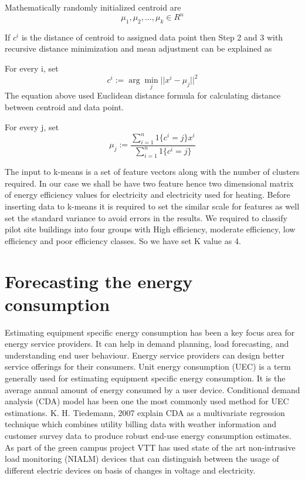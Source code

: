 Mathematically randomly initialized centroid are  
$${\mu_1,\mu_2,\dotsc,\mu_k}  \in R^{n}$$


If \(c^{i}\) is the distance of centroid to assigned data point then Step 2 and 3 with recursive distance minimization and mean adjustment can be explained as 

For every i, set 
\begin{equation}
c^{i} := \arg\min_j || x^{i} - \mu_j||^2
\end{equation} 
The equation above used Euclidean distance formula for calculating distance between centroid and data point. 

For every j, set
\begin{equation}
\mu_{j} := \frac{\sum\limits_{i=1}^n 1\{c^{i} =j\}x^{i}}{\sum\limits_{i=1}^n 1\{c^{i}=j\}}
\end{equation}

The input to k-means is a set of feature vectors along with the number of clusters required. In our case we shall be have two feature hence two dimensional matrix of energy efficiency values for electricity and electricity used for heating. Before inserting data to k-means it is required to set the similar scale for features as well set the standard variance to avoid errors in the results. We required to classify pilot site buildings into four groups with High efficiency, moderate efficiency, low efficiency and poor efficiency classes. So we have set K value as 4.

\section{Forecasting the energy consumption}\label{predict}
Estimating equipment specific energy consumption has been a key focus area for energy service providers. It can help in demand planning, load forecasting, and understanding end user behaviour.  Energy service providers can design better service offerings for their consumers. Unit energy consumption (UEC) is a term generally used for estimating equipment specific energy consumption. It is the average annual amount of energy consumed by a user device. Conditional demand analysis (CDA) model has been one the most commonly used method for UEC estimations. K. H. Tiedemann, 2007 explain CDA as a multivariate regression technique which combines utility billing data with weather information and customer survey data to produce robust end-use energy consumption estimates\cite{tiedemann2007using}. As part of the green campus project VTT has used state of the art non-intrusive load monitoring (NIALM)\cite{hart1992nonintrusive} devices that can distinguish between the usage of different electric devices on basis of changes in voltage and electricity. 

